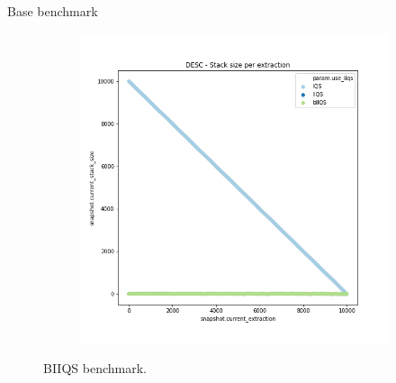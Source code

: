\documentclass{beamer}
\begin{document}
\begin{frame}{Base benchmark}
\begin{figure}
\begin{subfigure}[b]{\textwidth}
            \includegraphics[height=0.45\textheight]{chapter5/01-basebenchmark-03-sort-d-case.png.2-0.png}
        \end{subfigure}
        \caption{BIIQS benchmark.}
    \end{figure}
\end{frame}
\end{document}
